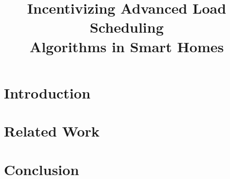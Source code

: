 \documentclass[10pt,nocopyrightspace]{sensys-proc}
\title{Incentivizing Advanced Load Scheduling\\Algorithms in Smart Homes}
\begin{document}
 
\maketitle

\begin{abstract}

\end{abstract}

\section{Introduction}
\label{sec:introduction}


\section{Related Work}
\label{sec:related}


\section{Conclusion}
\label{sec:conclusion}




\end{document}
